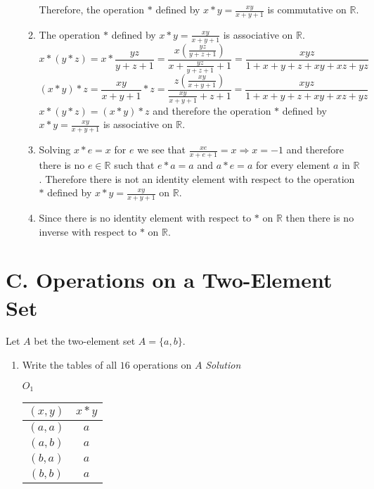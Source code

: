 \documentclass[12pt]{article}
\begin{document}
\begin{flushleft}
\begin{enumerate}
\begin{enumerate}
								Therefore, the operation $*$ defined by $x * y = \frac{xy}{x + y + 1}$ is commutative on $\mathbb{R}$.
							\item The operation $*$ defined by $x * y = \frac{xy}{x + y + 1}$ is associative on $\mathbb{R}$. \\
								$$x * (y *z) = x * \frac{yz}{y + z +1} = \frac{x\left( \frac{yz}{y+z+1} \right)}{x + \frac{yz}{y+z+1} + 1} = \frac{xyz}{1 + x + y + z + xy + xz +yz}$$
								$$(x * y) * z = \frac{xy}{x + y +1} * z = \frac{z\left( \frac{xy}{x+y+1} \right)}{\frac{xy}{x+y+1} + z + 1} = \frac{xyz}{1 + x + y + z + xy + xz +yz}$$
								$x * (y * z) = (x * y) * z$ and therefore the operation $*$ defined by $x * y = \frac{xy}{x + y + 1}$ is associative on $\mathbb{R}$.
							\item Solving $x*e = x$ for $e$ we see that $\frac{xe}{x + e +1} = x \Rightarrow x = -1$ and therefore there is 
								no $e \in \mathbb{R}$ such that $e * a = a$ and $a * e = a$ for every element $a$ in $\mathbb{R}$. Therefore 
								there is not an identity element with respect to the operation $*$ defined by $x * y = \frac{xy}{x + y + 1}$ on $\mathbb{R}$.
							\item Since there is no identity element with respect to $*$ on $\mathbb{R}$ then there is no inverse with respect to $*$ on $\mathbb{R}$.
						\end{enumerate}
					\end{enumerate}
      \section*{C. Operations on a Two-Element Set}

Let $A$ bet the two-element set $A = \{a,b\}.$

	\begin{enumerate}
		\item Write the tables of all $16$ operations on $A$
			\textit{Solution}
			\begin{minipage}[h]{.25\textwidth}
				$O_1$
    		\begin{tabular}{ c | c }
      		$(x,y)$ & $x*y$ \\
        	\hline
        	$(a,a)$ & $a$ \\
        	$(a,b)$ & $a$ \\
        	$(b,a)$ & $a$ \\
        	$(b,b)$ & $a$
      	\end{tabular}
    	\end{minipage}
        


\end{enumerate}














\end{flushleft}
\end{document}
